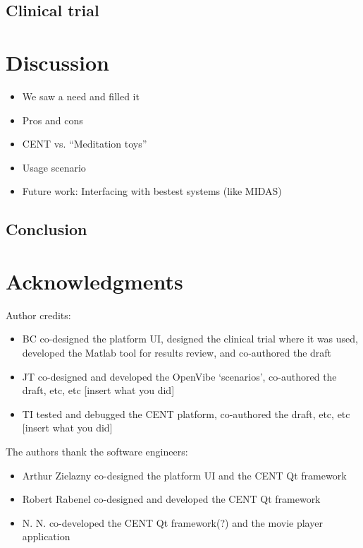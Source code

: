\documentclass[fleqn,10pt]{wlpeerj}
\begin{document}
\subsection{Clinical trial}
\lipsum[09]



\section{Discussion}
\label{disc}
\begin{itemize}
	\item We saw a need and filled it
	\item Pros and cons
	\item CENT vs. “Meditation toys”
	\item Usage scenario
	\item Future work: Interfacing with bestest systems (like MIDAS)
\end{itemize}
\lipsum[10] %





\subsection{Conclusion}

\lipsum[11] %








\section*{Acknowledgments}

Author credits:
\begin{itemize}
	\item BC co-designed the platform UI, designed the clinical trial where it was used, developed the Matlab tool for results review, and co-authored the draft
	
	\item JT co-designed and developed the OpenVibe ‘scenarios’, co-authored the draft, etc, etc [insert what you did]
	
	\item TI tested and debugged the CENT platform, co-authored the draft, etc, etc [insert what you did]
	
\end{itemize}

The authors thank the software engineers:
\begin{itemize}
	\item Arthur Zielazny co-designed the platform UI and the CENT Qt framework

	\item Robert Rabenel co-designed and developed the CENT Qt framework

	\item N. N. co-developed the CENT Qt framework(?) and the movie player application

\end{itemize}
\end{document}
